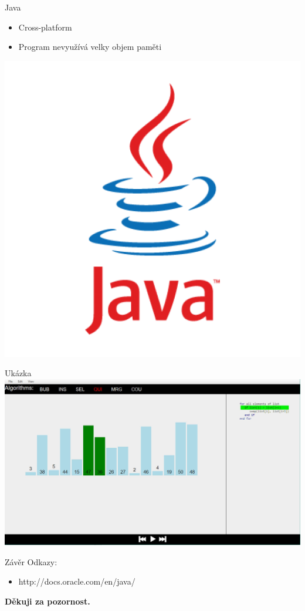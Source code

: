 \documentclass{beamer}
\begin{document}
	\begin{frame}{Java}
		\begin{itemize}
			\item Cross-platform
			\item Program nevyužívá velky objem paměti
		\end{itemize}
		\begin{center}
			\includegraphics[scale=0.2]{Images/java}
		\end{center}
		
	\end{frame}

	\begin{frame}{Ukázka}
		\includegraphics[scale=0.35]{Images/Demo}
	\end{frame}

	\begin{frame}{Závěr}
		Odkazy:
		\begin{itemize}
			\item http://docs.oracle.com/en/java/
		\end{itemize}
		\vspace{70pt}
		\centerline{\textbf{Děkuji za pozornost.}}
	\end{frame}
\end{document}
